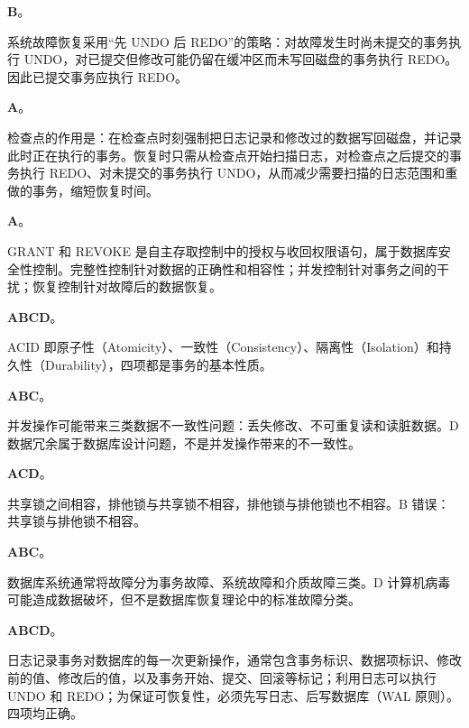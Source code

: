 \documentclass[a4paper,11pt]{article}
\begin{document}
\q \textbf{B}。\begin{analysis}系统故障恢复采用“先 UNDO 后 REDO”的策略：对故障发生时尚未提交的事务执行 UNDO，对已提交但修改可能仍留在缓冲区而未写回磁盘的事务执行 REDO。因此已提交事务应执行 REDO。\end{analysis}

\q \textbf{A}。\begin{analysis}检查点的作用是：在检查点时刻强制把日志记录和修改过的数据写回磁盘，并记录此时正在执行的事务。恢复时只需从检查点开始扫描日志，对检查点之后提交的事务执行 REDO、对未提交的事务执行 UNDO，从而减少需要扫描的日志范围和重做的事务，缩短恢复时间。\end{analysis}

\q \textbf{A}。\begin{analysis}GRANT 和 REVOKE 是自主存取控制中的授权与收回权限语句，属于数据库安全性控制。完整性控制针对数据的正确性和相容性；并发控制针对事务之间的干扰；恢复控制针对故障后的数据恢复。\end{analysis}


\q \textbf{ABCD}。\begin{analysis}ACID 即原子性（Atomicity）、一致性（Consistency）、隔离性（Isolation）和持久性（Durability），四项都是事务的基本性质。\end{analysis}

\q \textbf{ABC}。\begin{analysis}并发操作可能带来三类数据不一致性问题：丢失修改、不可重复读和读脏数据。D 数据冗余属于数据库设计问题，不是并发操作带来的不一致性。\end{analysis}

\q \textbf{ACD}。\begin{analysis}共享锁之间相容，排他锁与共享锁不相容，排他锁与排他锁也不相容。B 错误：共享锁与排他锁不相容。\end{analysis}

\q \textbf{ABC}。\begin{analysis}数据库系统通常将故障分为事务故障、系统故障和介质故障三类。D 计算机病毒可能造成数据破坏，但不是数据库恢复理论中的标准故障分类。\end{analysis}

\q \textbf{ABCD}。\begin{analysis}日志记录事务对数据库的每一次更新操作，通常包含事务标识、数据项标识、修改前的值、修改后的值，以及事务开始、提交、回滚等标记；利用日志可以执行 UNDO 和 REDO；为保证可恢复性，必须先写日志、后写数据库（WAL 原则）。四项均正确。\end{analysis}
\end{document}
